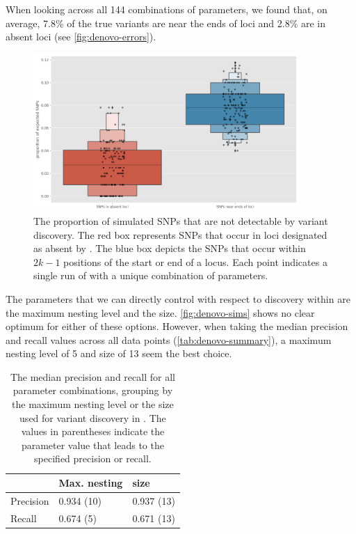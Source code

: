 When looking across all 144 combinations of parameters, we found that, on average, 7.8\% of the true variants are near the ends of loci and 2.8\% are in absent loci (see \autoref{fig:denovo-errors}). 

\begin{figure}
    \centering
    \includegraphics[width=0.9\textwidth]{Chapter1/Figs/denovo_errors.png}
    \caption{The proportion of simulated SNPs that are not detectable by \denovo{} variant discovery. The red box represents SNPs that occur in loci designated as absent by \pandora{}. The blue box depicts the SNPs that occur within $2k-1$ positions of the start or end of a locus. Each point indicates a single run of \pandora{} with a unique combination of parameters.}
    \label{fig:denovo-errors}
\end{figure}

\noindent
The parameters that we can directly control with respect to \denovo{} discovery within \pandora{} are the \prg{} maximum nesting level and the \denovo{} \kmer{} size. \autoref{fig:denovo-sims} shows no clear optimum for either of these options. However, when taking the median precision and recall values across all data points (\autoref{tab:denovo-summary}), a maximum nesting level of 5 and \denovo{} \kmer{} size of 13 seem the best choice.

\begin{table}
\centering
\begin{tabular}{@{}lll@{}}
\toprule
          & Max. nesting & \denovo{} \kmer{} size \\ \midrule
Precision & 0.934 (10)   & 0.937 (13)                                               \\
Recall    & 0.674 (5)    & 0.671 (13)                                               \\ \bottomrule
\end{tabular}
\caption{The median precision and recall for all parameter combinations, grouping by the maximum \prg{} nesting level or the \denovo{} \kmer{} size used for variant discovery in \pandora{}. The values in parentheses indicate the parameter value that leads to the specified precision or recall.}
\label{tab:denovo-summary}
\end{table}

